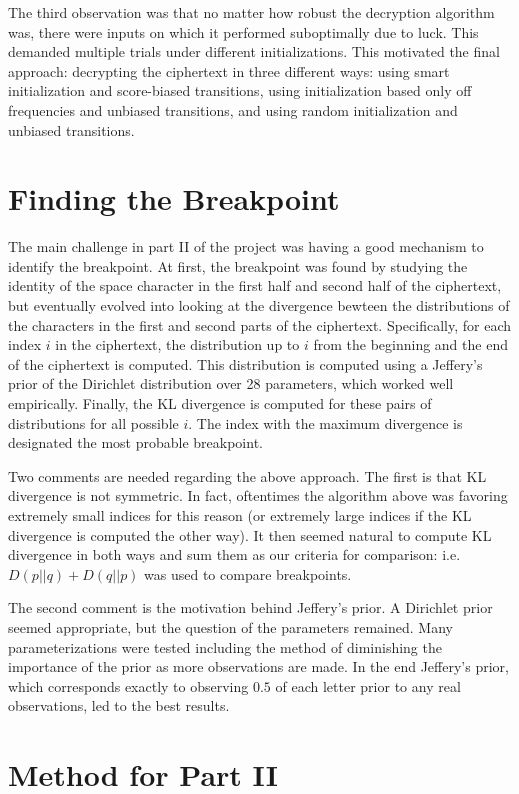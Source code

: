 \documentclass{article}
\theoremstyle{definition}
\theoremstyle{remark}
\begin{document}
The third observation was that no matter how robust the decryption algorithm was, there were inputs on which it performed suboptimally due to luck. This demanded multiple trials under different initializations. This motivated the final approach: decrypting the ciphertext in three different ways: using smart initialization and score-biased transitions, using initialization based only off frequencies and unbiased transitions, and using random initialization and unbiased transitions.

\section{Finding the Breakpoint}

The main challenge in part II of the project was having a good mechanism to identify the breakpoint. At first, the breakpoint was found by studying the identity of the space character in the first half and second half of the ciphertext, but eventually evolved into looking at the divergence bewteen the distributions of the characters in the first and second parts of the ciphertext. Specifically, for each index $i$ in the ciphertext, the distribution up to $i$ from the beginning and the end of the ciphertext is computed. This distribution is computed using a Jeffery's prior of the Dirichlet distribution over 28 parameters, which worked well empirically. Finally, the KL divergence is computed for these pairs of distributions for all possible $i$. The index with the maximum divergence is designated the most probable breakpoint.

Two comments are needed regarding the above approach. The first is that KL divergence is not symmetric. In fact, oftentimes the algorithm above was favoring extremely small indices for this reason (or extremely large indices if the KL divergence is computed the other way). It then seemed natural to compute KL divergence in both ways and sum them as our criteria for comparison: i.e. $D(p||q) + D(q||p)$ was used to compare breakpoints.

The second comment is the motivation behind Jeffery's prior. A Dirichlet prior seemed appropriate, but the question of the parameters remained. Many parameterizations were tested including the method of diminishing the importance of the prior as more observations are made. In the end Jeffery's prior, which corresponds exactly to observing $0.5$ of each letter prior to any real observations, led to the best results. 

\section{Method for Part II}
\end{document}
